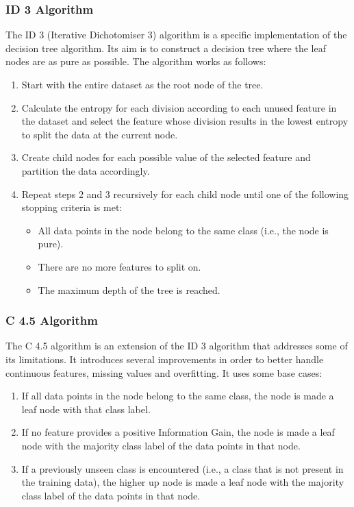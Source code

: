 \subsubsection{ID 3 Algorithm}
The ID 3 (Iterative Dichotomiser 3) algorithm is a specific implementation of the decision tree algorithm. Its aim is to construct a decision tree where the leaf nodes are as pure as possible. The algorithm works as follows:
\begin{enumerate}
    \item Start with the entire dataset as the root node of the tree.
    \item Calculate the entropy for each division according to each unused feature in the dataset and select the feature whose division results in the lowest entropy to split the data at the current node.
    \item Create child nodes for each possible value of the selected feature and partition the data accordingly.
    \item Repeat steps 2 and 3 recursively for each child node until one of the following stopping criteria is met:
    \begin{itemize}
        \item All data points in the node belong to the same class (i.e., the node is pure).
        \item There are no more features to split on.
        \item The maximum depth of the tree is reached.
    \end{itemize}
\end{enumerate}

\subsubsection{C 4.5 Algorithm}
The C 4.5 algorithm is an extension of the ID 3 algorithm that addresses some of its limitations. It introduces several improvements in order to better handle continuous features, missing values and overfitting. It uses some base cases:
\begin{enumerate}
    \item If all data points in the node belong to the same class, the node is made a leaf node with that class label.
    \item If no feature provides a positive Information Gain, the node is made a leaf node with the majority class label of the data points in that node.
    \item If a previously unseen class is encountered (i.e., a class that is not present in the training data), the higher up node is made a leaf node with the majority class label of the data points in that node.
\end{enumerate}

